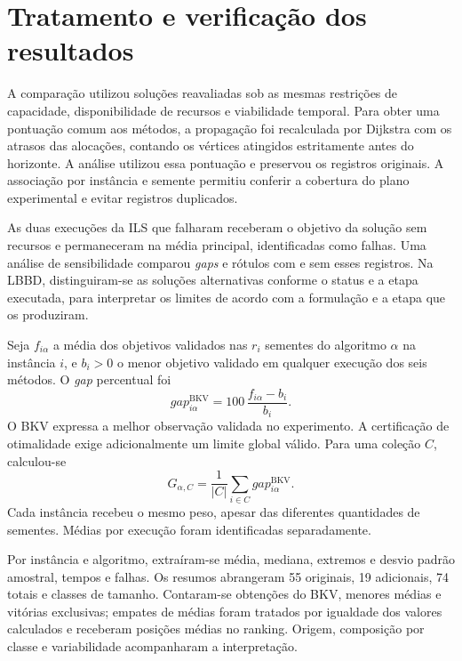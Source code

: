 \section{Tratamento e verificação dos resultados}\label{sec:met-analise}

A comparação utilizou soluções reavaliadas sob as mesmas restrições de
capacidade, disponibilidade de recursos e viabilidade temporal. Para obter
uma pontuação comum aos métodos, a propagação foi recalculada por Dijkstra
com os atrasos das alocações, contando os vértices atingidos estritamente
antes do horizonte. A análise utilizou essa pontuação e preservou os
registros originais. A associação por instância e semente permitiu
conferir a cobertura do plano experimental e evitar registros duplicados.

As duas execuções da ILS que falharam receberam o objetivo da solução sem
recursos e permaneceram na média principal, identificadas como falhas.
Uma análise de sensibilidade comparou \textit{gaps} e rótulos com e sem esses
registros. Na LBBD, distinguiram-se as soluções alternativas conforme o
status e a etapa executada, para interpretar os limites de acordo com a
formulação e a etapa que os produziram.

Seja $f_{i\alpha}$ a média dos objetivos validados nas $r_i$ sementes do
algoritmo $\alpha$ na instância $i$, e $b_i>0$ o menor objetivo validado
em qualquer execução dos seis métodos. O \textit{gap} percentual foi
\begin{equation}
 \mathit{gap}^{\mathrm{BKV}}_{i\alpha}
 =100\,\frac{f_{i\alpha}-b_i}{b_i}.
 \label{eq:gap-relativo}
\end{equation}
\noindent O BKV expressa a melhor observação validada no experimento.
A certificação de otimalidade exige adicionalmente um limite global válido.
Para uma coleção $C$, calculou-se
\begin{equation}
 G_{\alpha,C}=\frac{1}{|C|}\sum_{i\in C}
 \mathit{gap}^{\mathrm{BKV}}_{i\alpha}.
 \label{eq:met-agregado}
\end{equation}
\noindent Cada instância recebeu o mesmo peso, apesar das diferentes
quantidades de sementes. Médias por execução foram identificadas separadamente.

Por instância e algoritmo, extraíram-se média, mediana, extremos e desvio
padrão amostral, tempos e falhas. Os resumos abrangeram 55 originais,
19 adicionais, 74 totais e classes de tamanho. Contaram-se obtenções do
BKV, menores médias e vitórias exclusivas; empates de médias foram tratados
por igualdade dos valores calculados e receberam posições médias no ranking.
Origem, composição por classe e variabilidade acompanharam a interpretação.

